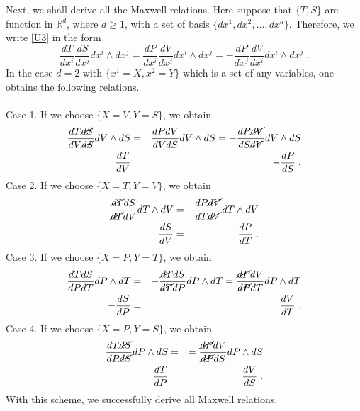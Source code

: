 \documentclass[12pt]{article}
\numberwithin{equation}{section}
\theoremstyle{remark}
\theoremstyle{definition}
\newcommand{\nn}{\nonumber}
\begin{document}
\\
\\
Next, we shall derive all the Maxwell relations. 
Here suppose that $\{ T,S\}$ are function in $\mathbb{R}^d$, where $d \geq 1$, with a set of basis $\{ dx^1,dx^2,...,dx^d \}$. Therefore, we write \eqref{U3} in the form
%
\begin{equation}
    \frac{dT}{dx^i}\frac{dS}{dx^j}dx^i\wedge dx^j=\frac{dP}{dx^i}\frac{dV}{dx^j}dx^i\wedge dx^j=-\frac{dP}{dx^j}\frac{dV}{dx^i}dx^i\wedge dx^j\;.
\end{equation}
In the case $d=2$ with $\{x^1=X,x^2=Y\}$ which is a set of any variables, one obtains the following relations.
\\
\\
Case 1. If we choose $\{X=V,Y=S\}$, we obtain
\begin{eqnarray}\label{MW1}
    \frac{dT\cancel{dS}}{dV\cancel{dS}}dV\wedge dS&=&\frac{dPdV}{dVdS}dV\wedge dS=-\frac{dP\cancel{dV}}{dS\cancel{dV}}dV\wedge dS\nn\\
    \frac{dT}{dV}&=&-\frac{dP}{dS}\;.
\end{eqnarray}
Case 2. If we choose $\{X=T,Y=V\}$, we obtain
\begin{eqnarray}\label{MW2}
    \frac{\cancel{dT}dS}{\cancel{dT}dV}dT\wedge dV&=&\frac{dP\cancel{dV}}{dT\cancel{dV}}dT\wedge dV\nn\\
    \frac{dS}{dV}&=&\frac{dP}{dT}\;.
\end{eqnarray}
Case 3. If we choose $\{X=P,Y=T\}$, we obtain
\begin{eqnarray}\label{MW3}
    \frac{dTdS}{dPdT}dP\wedge dT&=&-\frac{\cancel{dT}dS}{\cancel{dT}dP}dP\wedge dT=\frac{\cancel{dP}dV}{\cancel{dP}dT}dP\wedge dT\nn\\
    -\frac{dS}{dP}&=&\frac{dV}{dT}\;.
\end{eqnarray}
Case 4. If we choose $\{X=P,Y=S\}$, we obtain
\begin{eqnarray}\label{MW4}
    \frac{dT\cancel{dS}}{dP\cancel{dS}}dP\wedge dS&=&=\frac{\cancel{dP}dV}{\cancel{dP}dS}dP\wedge dS\nn\\
    \frac{dT}{dP}&=&\frac{dV}{dS}\;.
\end{eqnarray}
With this scheme, we successfully derive all Maxwell relations.
%
%
%
\end{document}
